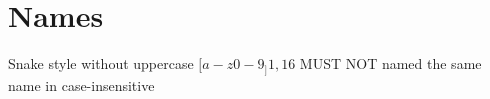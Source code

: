 \chapter{Names}
Snake style without uppercase
$[a-z0-9_]{1,16}$
MUST NOT named the same name in case-insensitive
